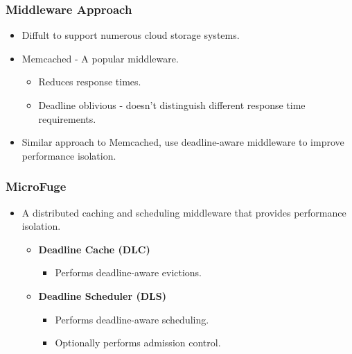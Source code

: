 \documentclass{beamer}
\newcommand{\myv}{\vspace{3 mm}}
\begin{document}
\begin{frame}
  \frametitle{Middleware Approach}
  \begin{itemize}
    \item Diffult to support numerous cloud storage systems.
      \myv
    \item Memcached - A popular middleware.
      \begin{itemize}
      \item Reduces response times.
      \item Deadline oblivious - doesn't distinguish different response time
        requirements.
      \end{itemize}
      \myv
    \item Similar approach to Memcached, use deadline-aware middleware to
      improve performance isolation.
  \end{itemize}
\end{frame}

\begin{frame}
  \frametitle{MicroFuge}
  \begin{itemize}
  \item A distributed caching and scheduling middleware that provides
    performance isolation.
    \myv
  \begin{itemize}
  \item \textbf{Deadline Cache (DLC)}
    \myv
      \begin{itemize}
      \item Performs deadline-aware evictions.
        \myv
      \end{itemize}
    \item \textbf{Deadline Scheduler (DLS)}
      \begin{itemize}
        \myv
      \item Performs deadline-aware scheduling.
        \myv
      \item {\textcolor[gray]{0.5} {Optionally performs admission control.}}
      \end{itemize}
  \end{itemize}
  \end{itemize}
\end{frame}

\end{document}
